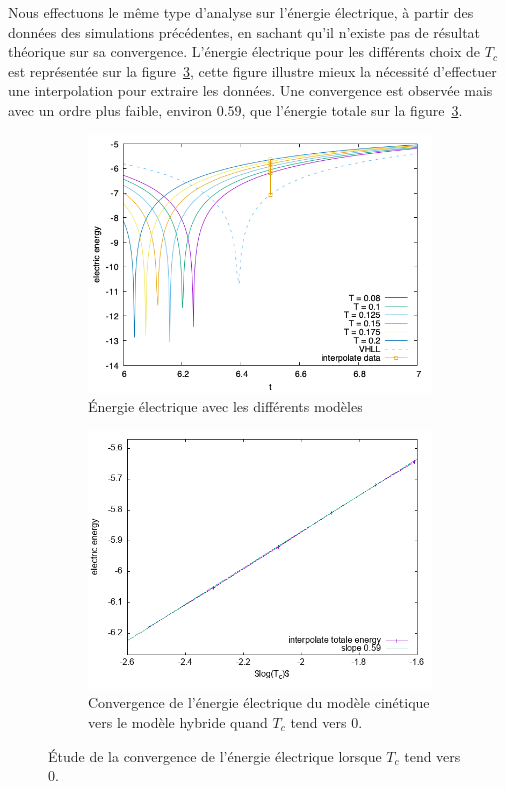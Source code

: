 Nous effectuons le même type d'analyse sur l'énergie électrique, à partir des données des simulations précédentes, en sachant qu'il n'existe pas de résultat théorique sur sa convergence. L'énergie électrique pour les différents choix de $T_c$ est représentée sur la figure~\ref{fig:limit:ee}, cette figure illustre mieux la nécessité d'effectuer une interpolation pour extraire les données. Une convergence est observée mais avec un ordre plus faible, environ $0.59$, que l'énergie totale sur la figure~\ref{fig:limit:ee}.
\begin{figure}[h]
  \centering
  \begin{subfigure}{0.45\textwidth}
    \centering
    \includegraphics[width=\textwidth]{img/limit_ee.png}
    \caption{Énergie électrique avec les différents modèles}
    \label{fig:limit:ee:ee}
  \end{subfigure}
  \begin{subfigure}{0.45\textwidth}
    \centering
    \includegraphics[width=\textwidth]{img/limit_slope_ee.png}
    \caption{Convergence de l'énergie électrique du modèle cinétique vers le modèle hybride quand $T_c$ tend vers $0$.}
    \label{fig:limit:ee:slope}
  \end{subfigure}
  \caption{Étude de la convergence de l'énergie électrique lorsque $T_c$ tend vers 0.}
  \label{fig:limit:ee}
\end{figure}

